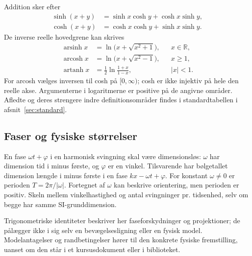 Addition sker efter
\begin{align*}
 \sinh(x+y)&=\sinh x\cosh y+\cosh x\sinh y,\\
 \cosh(x+y)&=\cosh x\cosh y+\sinh x\sinh y.
\end{align*}
De inverse reelle hovedgrene kan skrives
\begin{align*}
 \operatorname{arsinh}x&=\ln\bigl(x+\sqrt{x^2+1}\bigr), &&x\in\mathbb{R},\\
 \operatorname{arcosh}x&=\ln\bigl(x+\sqrt{x^2-1}\bigr), &&x\ge1,\\
 \operatorname{artanh}x&=\tfrac12\ln\frac{1+x}{1-x}, &&|x|<1.
\end{align*}
For arcosh vælges inversen til cosh på $[0,\infty)$; cosh er ikke injektiv
på hele den reelle akse. Argumenterne i logaritmerne er positive på de
angivne områder. Afledte og deres strengere indre definitionsområder
findes i standardtabellen i afsnit~\ref{sec:standard}.

\subsection{Faser og fysiske størrelser}
En fase $\omega t+\varphi$ i en harmonisk svingning skal være dimensionsløs:
$\omega$ har dimension tid i minus første, og $\varphi$ er en vinkel.
Tilsvarende har bølgetallet dimension længde i minus første i en fase
$kx-\omega t+\varphi$. For konstant $\omega\ne0$ er perioden $T=2\pi/|\omega|$.
Fortegnet af $\omega$ kan beskrive orientering, men perioden er positiv.
Skeln mellem vinkelhastighed og antal svingninger pr. tidsenhed, selv om
begge har samme SI-grunddimension.

Trigonometriske identiteter beskriver her faseforskydninger og projektioner;
de pålægger ikke i sig selv en bevægelsesligning eller en fysisk model.
Modelantagelser og randbetingelser hører til den konkrete fysiske
fremstilling, uanset om den står i et kursusdokument eller i biblioteket.
